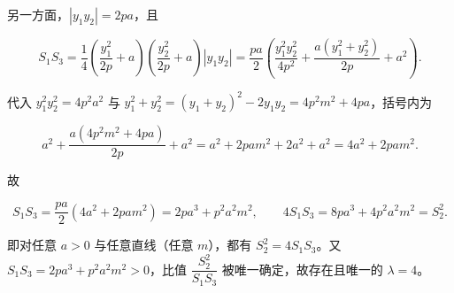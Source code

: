 \begin{answer}
另一方面，$|y_1y_2|=2pa$，且

\nopagebreak[4]
\[S_1S_3=\frac14\left(\frac{y_1^2}{2p}+a\right)\left(\frac{y_2^2}{2p}+a\right)|y_1y_2|
=\frac{pa}{2}\left(\frac{y_1^2y_2^2}{4p^2}+\frac{a\left(y_1^2+y_2^2\right)}{2p}+a^2\right).\]

代入 $y_1^2y_2^2=4p^2a^2$ 与 $y_1^2+y_2^2=(y_1+y_2)^2-2y_1y_2=4p^2m^2+4pa$，括号内为

\nopagebreak[4]
\[a^2+\frac{a\left(4p^2m^2+4pa\right)}{2p}+a^2=a^2+2pam^2+2a^2+a^2=4a^2+2pam^2.\]

故

\nopagebreak[4]
\[S_1S_3=\frac{pa}{2}\left(4a^2+2pam^2\right)=2pa^3+p^2a^2m^2,\qquad
4S_1S_3=8pa^3+4p^2a^2m^2=S_2^2.\]

即对任意 $a>0$ 与任意直线（任意 $m$），都有 $S_2^2=4S_1S_3$。又 $S_1S_3=2pa^3+p^2a^2m^2>0$，比值 $\dfrac{S_2^2}{S_1S_3}$ 被唯一确定，故存在且唯一的 $\lambda=4$。


\end{answer}
